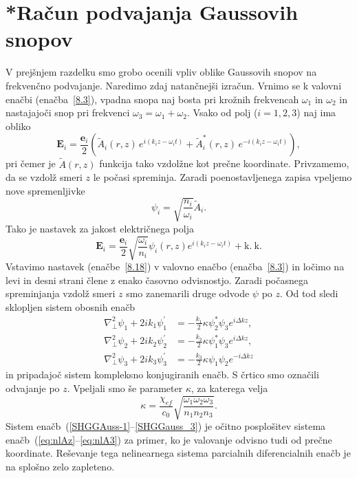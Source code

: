 \section{{*}Račun podvajanja Gaussovih snopov}
V prejšnjem razdelku smo grobo ocenili vpliv oblike Gaussovih snopov
na frekvenčno podvajanje. Naredimo zdaj natančnejši izračun. Vrnimo se k valovni
enačbi (enačba~\ref{8.3}), vpadna snopa naj bosta pri krožnih frekvencah
$\omega_{1}$ in $\omega_{2}$ in nastajajoči snop pri frekvenci
$\omega_{3}=\omega_{1}+\omega_{2}$.
Vsako od polj ($i=1,2,3$) naj ima obliko 
\begin{equation}
\mathbf{E}_{i}  = \frac{\mathbf{e}_{i}}{2}\left(\tilde{A}_{i}(r,z)\, 
e^{i(k_{i}z-\omega_{i}t)}+\tilde{A}_{i}^{*}(r,z)\, e^{-i(k_{i}z-\omega_{i}t)}\right)\!,
\end{equation}
pri čemer je $\tilde{A}(r,z)$ funkcija tako vzdolžne kot prečne koordinate. Privzamemo, 
da se vzdolž smeri  $z$ le počasi spreminja.
Zaradi poenostavljenega zapisa vpeljemo nove spremenljivke 
\begin{equation}
\psi_i = \sqrt{\frac{n_i}{\omega_i}}\tilde{A}_i.
\end{equation}
Tako je nastavek za jakost električnega polja
\begin{equation}
\mathbf{E}_{i}=\frac{\mathbf{e}_{i}}{2}\sqrt{\frac{\omega_{i}}{n_{i}}}\psi_{i}(r,z)
e^{i(k_{i}z-\omega_{i}t)}+\mathrm{k.~k.}
\label{8.18}
\end{equation}
Vstavimo nastavek (enačbe~\ref{8.18}) v valovno
enačbo (enačba~\ref{8.3}) in ločimo na levi in desni strani člene z enako časovno odvisnostjo.
Zaradi počasnega spreminjanja vzdolž smeri $z$ smo zanemarili druge odvode 
$\psi$ po $z$. Od tod sledi sklopljen sistem obosnih enačb 
\begin{align}
\nabla_{\perp}^{2}\psi_{1}+2ik_{1}\psi_{1}^{\prime} & =  -
\frac{k_{1}}{2}\kappa\psi_{2}^{\ast}\psi_{3}e^{i\Delta kz},\label{SHGGAuss-1}\\
\nabla_{\perp}^{2}\psi_{2}+2ik_{2}\psi_{2}^{\prime} & =  -
\frac{k_{2}}{2}\kappa\psi_{1}^{\ast}\psi_{3}e^{i\Delta kz},\\
\nabla_{\perp}^{2}\psi_{3}+2ik_{3}\psi_{3}^{\prime} & =
 - \frac{k_{3}}{2}\kappa\psi_{1}\psi_{2}e^{-i\Delta kz}
\label{SHGGauss_3}
\end{align}
in pripadajoč sistem kompleksno konjugiranih enačb. S črtico smo označili odvajanje po $z$. 
Vpeljali smo še parameter $\kappa$, za katerega velja
\begin{equation}
\kappa=\frac{\chi_{ef}}{c_0} \sqrt{\frac{\omega_{1}\omega_{2}\omega_{3}}{n_{1}n_{2}n_{3}}}.
\label{8.20}
\end{equation}
Sistem enačb~(\ref{SHGGAuss-1}--\ref{SHGGauss_3}) je očitno
posplošitev sistema enačb~(\ref{eq:nlAz}--\ref{eq:nlA3}) za primer, ko je valovanje odvisno
tudi od prečne koordinate. Reševanje tega nelinearnega sistema parcialnih
diferencialnih enačb je na splošno zelo zapleteno.

